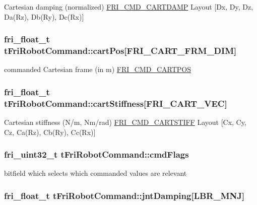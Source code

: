 \-Cartesian damping (normalized) \hyperlink{friComm_8h_a7f86e8da8f245ed7f72238c735ab8144}{\-F\-R\-I\-\_\-\-C\-M\-D\-\_\-\-C\-A\-R\-T\-D\-A\-M\-P} \-Layout \mbox{[}\-Dx, \-Dy, \-Dz, \-Da(\-Rz), \-Db(\-Ry), \-Dc(\-Rx)\mbox{]} \hypertarget{structtFriRobotCommand_a5fd5344efcb521078a4ee5f50e68ff88}{
\subsubsection[{cart\-Pos}]{\setlength{\rightskip}{0pt plus 5cm}fri\-\_\-float\-\_\-t {\bf t\-Fri\-Robot\-Command\-::cart\-Pos}\mbox{[}{\bf \-F\-R\-I\-\_\-\-C\-A\-R\-T\-\_\-\-F\-R\-M\-\_\-\-D\-I\-M}\mbox{]}}}\label{structtFriRobotCommand_a5fd5344efcb521078a4ee5f50e68ff88}
commanded \-Cartesian frame (in m) \hyperlink{friComm_8h_a1552ed5d9d8cd58d8f7f796e74cc7ee4}{\-F\-R\-I\-\_\-\-C\-M\-D\-\_\-\-C\-A\-R\-T\-P\-O\-S} \hypertarget{structtFriRobotCommand_ac999a3b8870c89afef26d14eac46c3ec}{
\subsubsection[{cart\-Stiffness}]{\setlength{\rightskip}{0pt plus 5cm}fri\-\_\-float\-\_\-t {\bf t\-Fri\-Robot\-Command\-::cart\-Stiffness}\mbox{[}{\bf \-F\-R\-I\-\_\-\-C\-A\-R\-T\-\_\-\-V\-E\-C}\mbox{]}}}\label{structtFriRobotCommand_ac999a3b8870c89afef26d14eac46c3ec}
\-Cartesian stiffness (\-N/m, \-Nm/rad) \hyperlink{friComm_8h_aee0d50447b82f0ae83876808ccc1905f}{\-F\-R\-I\-\_\-\-C\-M\-D\-\_\-\-C\-A\-R\-T\-S\-T\-I\-F\-F} \-Layout \mbox{[}\-Cx, \-Cy, \-Cz, \-Ca(\-Rz), \-Cb(\-Ry), \-Cc(\-Rx)\mbox{]} \hypertarget{structtFriRobotCommand_a281d911c64b7603edab47c904f5961b3}{
\subsubsection[{cmd\-Flags}]{\setlength{\rightskip}{0pt plus 5cm}fri\-\_\-uint32\-\_\-t {\bf t\-Fri\-Robot\-Command\-::cmd\-Flags}}}\label{structtFriRobotCommand_a281d911c64b7603edab47c904f5961b3}
bitfield which selects which commanded values are relevant \hypertarget{structtFriRobotCommand_a6977a609aa6619c7d567a25b87c3d3ae}{
\subsubsection[{jnt\-Damping}]{\setlength{\rightskip}{0pt plus 5cm}fri\-\_\-float\-\_\-t {\bf t\-Fri\-Robot\-Command\-::jnt\-Damping}\mbox{[}{\bf \-L\-B\-R\-\_\-\-M\-N\-J}\mbox{]}}}\label{structtFriRobotCommand_a6977a609aa6619c7d567a25b87c3d3ae}
